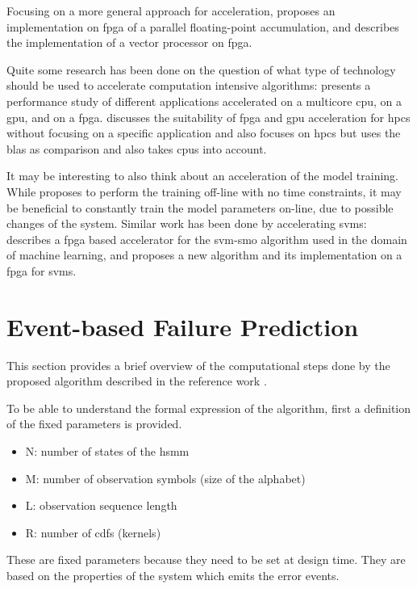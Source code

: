 \documentclass[mscthesis]{usiinfthesis}
\begin{document}
Focusing on a more general approach for acceleration, \cite{ARITH13_Kadric}
proposes an implementation on \gls{fpga} of a parallel floating-point
accumulation, and \cite{ITNG07_Yang} describes the implementation of a vector
processor on \gls{fpga}.

Quite some research has been done on the question of what type of technology
should be used to accelerate computation intensive algorithms:
\cite{SASP08_Che} presents a performance study of different applications
accelerated on a multicore \gls{cpu}, on a \gls{gpu}, and on a \gls{fpga}.
\cite{FPL10_Jones} discusses the suitability of \gls{fpga} and \gls{gpu}
acceleration for \gls{hpcs} without focusing on a specific application and
\cite{ISVLSI10_Kestur} also focuses on \gls{hpcs} but uses the \gls{blas} as
comparison and also takes \glspl{cpu} into account.

It may be interesting to also think about an acceleration of the model
training. While \cite{salfner08} proposes to perform the training off-line with
no time constraints, it may be beneficial to constantly train the model
parameters on-line, due to possible changes of the system. Similar work has
been done by accelerating \glspl{svm}: \cite{FCCM09_Cadambi} describes
a \gls{fpga} based accelerator for the \gls{svm}-\gls{smo} algorithm used in
the domain of machine learning, and \cite{IEEE03_Anguita} proposes a new
algorithm and its implementation on a \gls{fpga} for \glspl{svm}.

\chapter{Event-based Failure Prediction}
\label{ch:event}
\glsresetall %

This section provides a brief overview of the computational steps done by the
proposed algorithm described in the reference work \cite{salfner08}.

To be able to understand the formal expression of the algorithm, first
a definition of the fixed parameters is provided.
\begin{itemize}
    \item N: number of states of the \gls{hsmm}
    \item M: number of observation symbols (size of the alphabet)
    \item L: observation sequence length
    \item R: number of \glspl{cdf} (kernels)
\end{itemize}
These are fixed parameters because they need to be set at design time. They are
based on the properties of the system which emits the error events.
\end{document}

